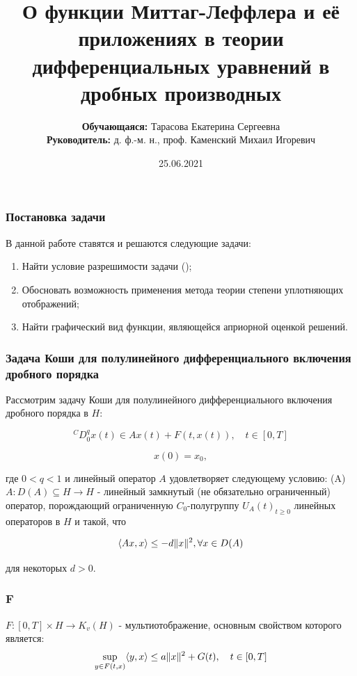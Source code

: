 \documentclass{beamer}
\title{О функции Миттаг-Леффлера и её приложениях в теории дифференциальных уравнений в дробных производных}
\date{25.06.2021}
\author{\textbf{Обучающаяся:} Тарасова Екатерина Сергеевна\\\textbf{Руководитель:} д. ф.-м. н., проф. Каменский Михаил Игоревич}
\DeclarePairedDelimiter{\norm}{\lVert}{\rVert}
\begin{document}
    \frame{\titlepage}

    \begin{frame}
        \frametitle{Постановка задачи}
        В данной работе ставятся и решаются следующие задачи:
        \begin{enumerate}
            \item Найти условие разрешимости задачи ();
            \item Обосновать возможность применения метода теории степени уплотняющих отображений;
            \item Найти графический вид функции, являющейся априорной оценкой решений.
        \end{enumerate}
    \end{frame}

    \begin{frame}
        \frametitle{Задача Коши для полулинейного дифференциального включения дробного порядка}
        Рассмотрим задачу Коши для полулинейного дифференциального включения дробного порядка в $H$:

        \begin{equation}
            \label{eq:cd_0q}
            {}^CD_{0}^{q}x(t) \in Ax(t) + F(t, x(t)), \quad t \in [0, T]
        \end{equation}

        \begin{equation}
            \label{eq:cd_0q_x0}
            x(0) = x_0,
        \end{equation}

        \noindent где $0 < q < 1$ и линейный оператор $A$ удовлетворяет следующему условию:
        (A) $A: D(A) \subseteq H \rightarrow H$ - линейный замкнутый (не обязательно ограниченный) оператор, порождающий ограниченную $C_0$-полугруппу
        ${U_A(t)}_{t \geq 0}$ линейных операторов в $H$ и такой, что

        \begin{equation*}
            \langle Ax, x \rangle \leq -d \norm{x}^2, \forall x \in D(A)
        \end{equation*}

        \noindent для некоторых $d > 0$.
    \end{frame}

    \begin{frame}
        \frametitle{F}
        $F: [0, T] \times H \rightarrow K_v(H)$ - мультиотображение, основным свойством которого является:
        \begin{equation*}
            \sup_{y \in F(t,x)} \langle y,x \rangle \leq a \norm{x}^2 + G(t), \quad t \in [0, T]
        \end{equation*}
    \end{frame}
\end{document}
